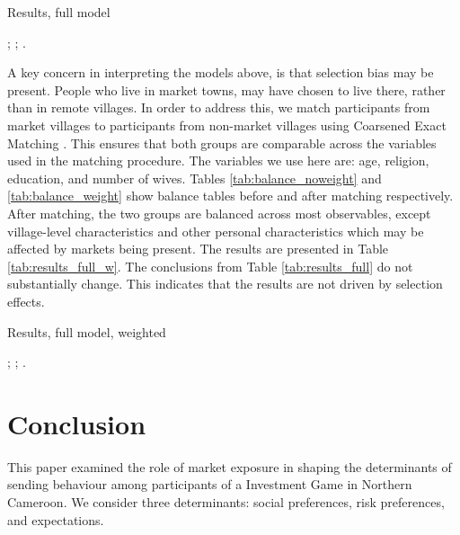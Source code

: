\begin{threeparttable}[p!]
	\small
	\caption{Results, full model}
	\label{tab:results_full}
	\centering
	
	\begin{tablenotes}
		\footnotesize
		\item \camsig; \camcluster; \camcontrols.
		\item
	\end{tablenotes}
\end{threeparttable}

A key concern in interpreting the models above, is that selection bias may be present. People who live in market towns, may have chosen to live there, rather than in remote villages. In order to address this, we match participants from market villages to participants from non-market villages using Coarsened Exact Matching \citep{Blackwell2010}. This ensures that both groups are comparable across the variables used in the matching procedure. The variables we use here are: age, religion, education, and number of wives. Tables \ref{tab:balance_noweight} and \ref{tab:balance_weight} show balance tables before and after matching respectively. After matching, the two groups are balanced across most observables, except village-level characteristics and other personal characteristics which may be affected by markets being present. The results are presented in Table \ref{tab:results_full_w}. The conclusions from Table \ref{tab:results_full} do not substantially change. This indicates that the results are not driven by selection effects.

\begin{threeparttable}[p!]
	\small
	\caption{Results, full model, weighted}
	\label{tab:results_full_w}
	\centering
	
	\begin{tablenotes}
		\footnotesize
		\item \camsig; \camcluster; \camcontrols.
		\item
	\end{tablenotes}
\end{threeparttable}

\flushbottom
\section{Conclusion}
This paper examined the role of market exposure in shaping the determinants of sending behaviour among participants of a Investment Game in Northern Cameroon. We consider three determinants: social preferences, risk preferences, and expectations. 

